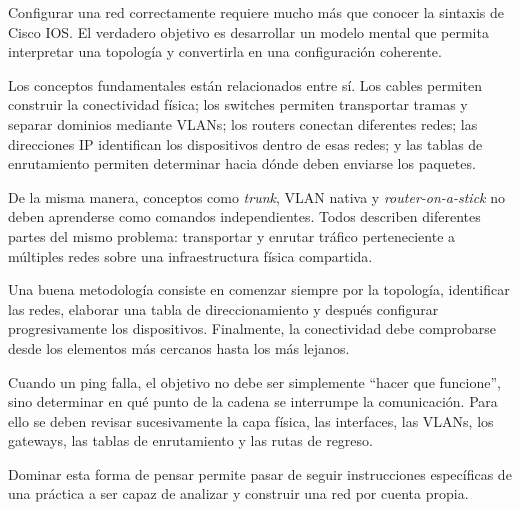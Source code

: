 \documentclass[12pt]{article}
\begin{document}
Configurar una red correctamente requiere mucho más que conocer la sintaxis
de Cisco IOS. El verdadero objetivo es desarrollar un modelo mental que
permita interpretar una topología y convertirla en una configuración
coherente.

Los conceptos fundamentales están relacionados entre sí. Los cables
permiten construir la conectividad física; los switches permiten transportar
tramas y separar dominios mediante VLANs; los routers conectan diferentes
redes; las direcciones IP identifican los dispositivos dentro de esas redes;
y las tablas de enrutamiento permiten determinar hacia dónde deben enviarse
los paquetes.

De la misma manera, conceptos como \textit{trunk}, VLAN nativa y
\textit{router-on-a-stick} no deben aprenderse como comandos independientes.
Todos describen diferentes partes del mismo problema: transportar y enrutar
tráfico perteneciente a múltiples redes sobre una infraestructura física
compartida.

Una buena metodología consiste en comenzar siempre por la topología,
identificar las redes, elaborar una tabla de direccionamiento y después
configurar progresivamente los dispositivos. Finalmente, la conectividad
debe comprobarse desde los elementos más cercanos hasta los más lejanos.

Cuando un ping falla, el objetivo no debe ser simplemente ``hacer que
funcione'', sino determinar en qué punto de la cadena se interrumpe la
comunicación. Para ello se deben revisar sucesivamente la capa física, las
interfaces, las VLANs, los gateways, las tablas de enrutamiento y las rutas
de regreso.

Dominar esta forma de pensar permite pasar de seguir instrucciones
específicas de una práctica a ser capaz de analizar y construir una red por
cuenta propia.
\end{document}
